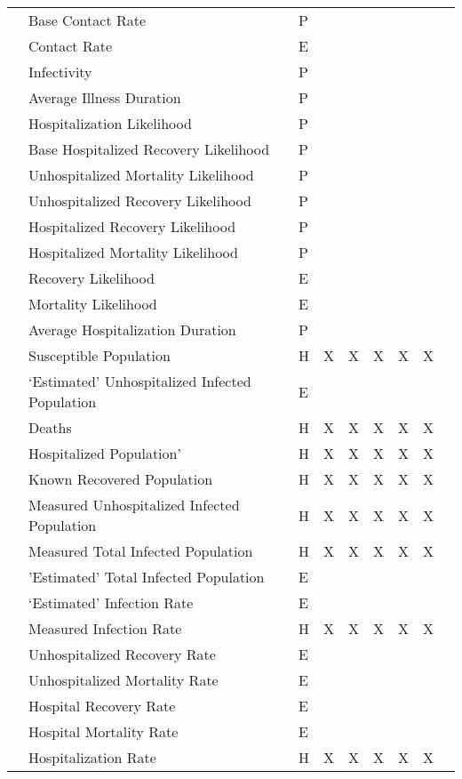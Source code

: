 \begin{center}
\begin{longtable}{|C{1.5cm}|C{2.5cm}|C{0.75cm}|C{1cm}|C{1cm}|C{2cm}|C{1.5cm}|C{1.5cm}|C{1cm}|}
 & Base Contact Rate & P &  & & & & \\ 
& Contact Rate & E & & & & & \\
& Infectivity & P & & & & & \\
& Average Illness Duration & P & & & & & \\
& Hospitalization Likelihood & P & & & & & \\
& Base Hospitalized Recovery Likelihood & P & & & & & \\
& Unhospitalized Mortality Likelihood & P & & & & & \\
& Unhospitalized Recovery Likelihood & P & & & & & \\
& Hospitalized Recovery Likelihood & P & & & & & \\
& Hospitalized Mortality Likelihood & P & & & & & \\
& Recovery Likelihood & E & & & & & \\
& Mortality Likelihood & E & & & & & \\
& Average Hospitalization Duration & P & & & & & \\ \hline

 & Susceptible Population & H & X & X & X & X & X \\ 
& `Estimated' Unhospitalized Infected Population & E & & & & & \\ 
& Deaths & H & X & X & X & X & X \\ 
& Hospitalized Population' & H & X & X & X & X & X \\ 
& Known Recovered Population & H & X & X & X & X & X \\ 
& Measured Unhospitalized Infected Population & H & X & X & X & X & X \\ 
& Measured Total Infected Population & H & X & X & X & X & X \\ 
& 'Estimated' Total Infected Population & E & & & & & \\ \hline

 & `Estimated' Infection Rate & E & & & & & \\ 
& Measured Infection Rate & H & X & X & X & X & X \\ 
& Unhospitalized Recovery Rate & E & & & & & \\ 
& Unhospitalized Mortality Rate & E & & & & & \\ 
& Hospital Recovery Rate & E & & & & & \\ 
& Hospital Mortality Rate & E & & & & & \\ 
& Hospitalization Rate & H & X & X & X & X & X \\ \hline



\end{longtable}
\end{center}
